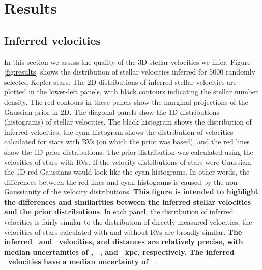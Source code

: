 \section{Results}
\label{sec:results}

\subsection{Inferred velocities}

In this section we assess the quality of the 3D stellar velocities we infer.
Figure \ref{fig:results} shows the distribution of stellar velocities inferred
for 5000 randomly selected Kepler stars.
The 2D distributions of inferred stellar velocities are plotted in the
lower-left panels, with black contours indicating the stellar number density.
The red contours in these panels show the marginal projections of the
Gaussian prior in 2D.
The diagonal panels show the 1D distributions (histograms) of stellar
velocities.
The black histogram shows the distribution of inferred velocities, the cyan
histogram shows the distribution of velocities calculated for stars with RVs
(on which the prior was based), and the red lines show the 1D prior
distributions.
The prior distribution was calculated using the velocities of stars with RVs.
If the velocity distributions of stars were Gaussian, the 1D red Gaussians
would look like the cyan histograms.
In other words, the differences between the red lines and cyan histograms
is caused by the non-Gaussianity of the velocity distributions.
{\bf This figure is intended to highlight the differences and similarities
between the inferred stellar velocities and the prior distributions}.
In each panel, the distribution of inferred velocities is fairly similar to
the distribution of directly-measured velocities; the velocities of stars
calculated with and without RVs are broadly similar.
{\bf The inferred \vx\ and \vz\ velocities, and distances are relatively
precise, with median uncertainties of \vxprecision \kms, \vzprecision\ \kms,
and \dprecision\ kpc, respectively.
The inferred \vy\ velocities have a median uncertainty of \vyprecision\ \kms}.

